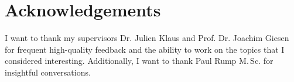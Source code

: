 \chapter{Acknowledgements}

I want to thank my supervisors Dr. Julien Klaus and Prof. Dr. Joachim Giesen
for frequent high-quality feedback
and the ability to work on the topics that I considered interesting.
Additionally, I want to thank Paul Rump M.\,Sc. for insightful conversations.